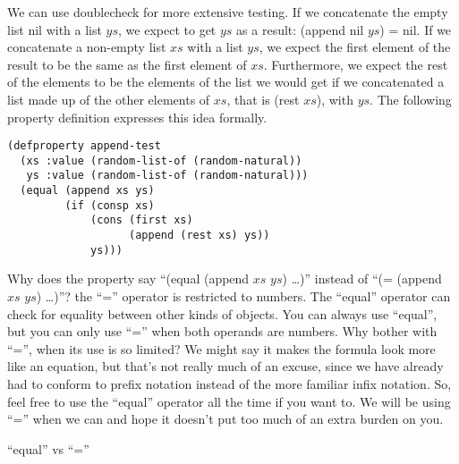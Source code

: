We can use doublecheck for more extensive testing. If we concatenate the empty list nil with a list $ys$, we expect to get $ys$ as a result: (append nil $ys$) = nil. If we concatenate a non-empty list $xs$ with a list $ys$, we expect the first element of the result to be the same as the first element of $xs$. Furthermore, we expect the rest of the elements to be the elements of the list we would get if we concatenated a list made up of the other elements of $xs$, that is (rest $xs$),  with $ys$. The following property definition expresses this idea formally.

\begin{lstlisting}
(defproperty append-test
  (xs :value (random-list-of (random-natural))
   ys :value (random-list-of (random-natural)))
  (equal (append xs ys)
         (if (consp xs)
             (cons (first xs)
                   (append (rest xs) ys))
             ys)))
\end{lstlisting}

\begin{aside}
Why does the property say ``(equal (append $xs$ $ys$) \dots)'' instead of ``(= (append $xs$ $ys$) \dots)''? the ``='' operator is restricted to numbers. The ``equal'' operator can check for equality between other kinds of objects. You can always use ``equal'', but you can only use ``='' when both operands are numbers. Why bother with ``='', when its use is so limited? We might say it makes the formula look more like an equation, but that's not really much of an excuse, since we have already had to conform to prefix notation instead of the more familiar infix notation. So, feel free to use the ``equal'' operator all the time if you want to. We will be using ``='' when we can and hope it doesn't put too much of an extra burden on you.
\caption{``equal'' vs ``=''}
\label{equal}
\end{aside}

\begin{comment}
This might not be the first test you would think of, but if the test failed to pass, you would for sure know something was wrong with the append operator.
This is another property that ACL2 can prove when it is stated as a theorem.

\begin{lstlisting}
(defthmd append-thm
  (equal (append xs ys)
         (if (consp xs)
             (cons (first xs)            ; {app1}
                   (append (rest xs) ys))
             ys)))                       ; {app0}
\end{lstlisting}
\end{comment}

